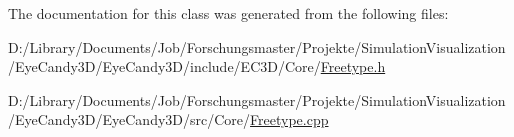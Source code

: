 The documentation for this class was generated from the following files\+:\begin{DoxyCompactItemize}
\item 
D\+:/\+Library/\+Documents/\+Job/\+Forschungsmaster/\+Projekte/\+Simulation\+Visualization/\+Eye\+Candy3\+D/\+Eye\+Candy3\+D/include/\+E\+C3\+D/\+Core/\mbox{\hyperlink{_freetype_8h}{Freetype.\+h}}\item 
D\+:/\+Library/\+Documents/\+Job/\+Forschungsmaster/\+Projekte/\+Simulation\+Visualization/\+Eye\+Candy3\+D/\+Eye\+Candy3\+D/src/\+Core/\mbox{\hyperlink{_freetype_8cpp}{Freetype.\+cpp}}\end{DoxyCompactItemize}
